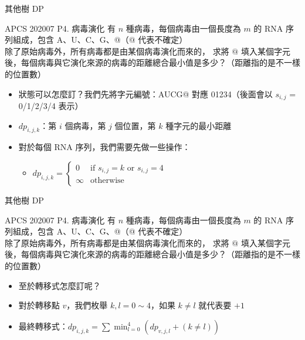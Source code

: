 \documentclass[aspectratio=169]{beamer}
\begin{document}
    \begin{frame}{其他樹 DP}
        \begin{block}{APCS 202007 P4. 病毒演化}
            有 $n$ 種病毒，每個病毒由一個長度為 $m$ 的 RNA 序列組成，包含 A、U、C、G、@（@ 代表不確定）\\
            除了原始病毒外，所有病毒都是由某個病毒演化而來的，
            求將 $@$ 填入某個字元後，每個病毒與它演化來源的病毒的距離總合最小值是多少？（距離指的是不一樣的位置數）
        \end{block}

        \begin{itemize}
            \item<1-> 狀態可以怎麼訂？我們先將字元編號：AUCG@ 對應 01234（後面會以 $s_{i, j}$ = 0/1/2/3/4 表示）
            \item<2-> $dp_{i, j, k}$：第 $i$ 個病毒，第 $j$ 個位置，第 $k$ 種字元的最小距離
            \item<3-> 對於每個 RNA 序列，我們需要先做一些操作：
            \begin{itemize}
                \item<4-> $dp_{i, j, k} = \begin{cases}
                    0 & \text{if } s_{i, j} = k \text{ or } s_{i, j} = 4 \\
                    \infty & \text{otherwise}
                \end{cases}$
            \end{itemize}
        \end{itemize}
    \end{frame}

    \begin{frame}{其他樹 DP}
        \begin{block}{APCS 202007 P4. 病毒演化}
            有 $n$ 種病毒，每個病毒由一個長度為 $m$ 的 RNA 序列組成，包含 A、U、C、G、@（@ 代表不確定）\\
            除了原始病毒外，所有病毒都是由某個病毒演化而來的，
            求將 $@$ 填入某個字元後，每個病毒與它演化來源的病毒的距離總合最小值是多少？（距離指的是不一樣的位置數）
        \end{block}

        \begin{itemize}
            \item<1-> 至於轉移式怎麼訂呢？
            \item<2-> 對於轉移點 $v$，我們枚舉 $k, l = 0 \sim 4$，如果 $k \neq l$ 就代表要 $+1$
            \item<3-> 最終轉移式：$dp_{i, j, k} =
                \sum\min_{l = 0}^{4}(dp_{v, j, l} + (k \neq l))$
        \end{itemize}
    \end{frame}
\end{document}
